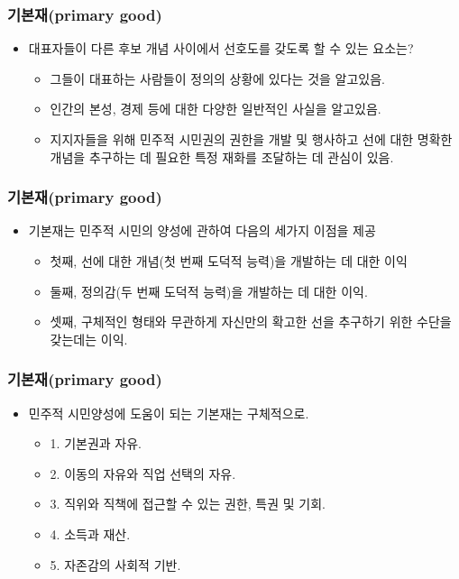 \documentclass[aspectratio=169,xcolor=dvipsnames,handout]{beamer}
\begin{document}
\begin{frame}[<+->]
\frametitle{기본재(primary good)}
    \begin{itemize}
        \item  대표자들이 다른 후보 개념 사이에서 선호도를 갖도록 할 수 있는 요소는?
        \begin{itemize}
            \item  그들이 대표하는 사람들이 정의의 상황에 있다는 것을 알고있음.
            \item  인간의 본성, 경제 등에 대한 다양한 일반적인 사실을 알고있음.
            \item  지지자들을 위해 민주적 시민권의 권한을 개발 및 행사하고 선에 대한 명확한 개념을 추구하는 데 필요한 특정 재화를 조달하는 데 관심이 있음.
        \end{itemize}
    \end{itemize}
\end{frame}


\begin{frame}[<+->]
\frametitle{기본재(primary good)}
    \begin{itemize}
        \item  기본재는 민주적 시민의 양성에 관하여 다음의 세가지 이점을 제공
        \begin{itemize}
            \item  첫째, 선에 대한 개념(첫 번째 도덕적 능력)을 개발하는 데 대한 이익
            \item  둘째, 정의감(두 번째 도덕적 능력)을 개발하는 데 대한 이익.
            \item  셋째, 구체적인 형태와 무관하게 자신만의 확고한 선을 추구하기 위한 수단을 갖는데는 이익.
        \end{itemize}
    \end{itemize}
\end{frame}

\begin{frame}[<+->]
\frametitle{기본재(primary good)}
    \begin{itemize}
        \item 민주적 시민양성에 도움이 되는 기본재는 구체적으로.
        \begin{itemize}
            \item  1. 기본권과 자유.
            \item  2. 이동의 자유와 직업 선택의 자유.
            \item  3. 직위와 직책에 접근할 수 있는 권한, 특권 및 기회.
            \item  4. 소득과 재산.
            \item  5. 자존감의 사회적 기반.
        \end{itemize}
    \end{itemize}
\end{frame}
\end{document}
